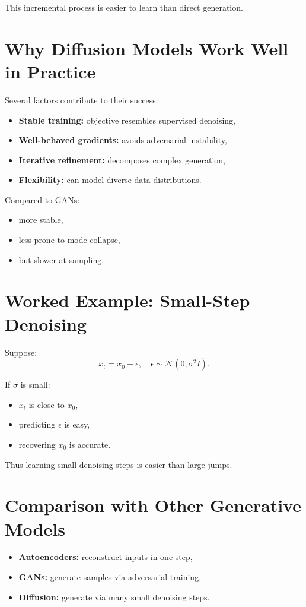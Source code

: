 This incremental process is easier to learn than direct generation.

\section{Why Diffusion Models Work Well in Practice}

Several factors contribute to their success:

\begin{itemize}
    \item \textbf{Stable training:} objective resembles supervised denoising,
    \item \textbf{Well-behaved gradients:} avoids adversarial instability,
    \item \textbf{Iterative refinement:} decomposes complex generation,
    \item \textbf{Flexibility:} can model diverse data distributions.
\end{itemize}

Compared to GANs:
\begin{itemize}
    \item more stable,
    \item less prone to mode collapse,
    \item but slower at sampling.
\end{itemize}

\section{Worked Example: Small-Step Denoising}

Suppose:
\[
x_t = x_0 + \epsilon,
\quad \epsilon \sim \mathcal{N}(0, \sigma^2 I).
\]

If $\sigma$ is small:
\begin{itemize}
    \item $x_t$ is close to $x_0$,
    \item predicting $\epsilon$ is easy,
    \item recovering $x_0$ is accurate.
\end{itemize}

Thus learning small denoising steps is easier than large jumps.

\section{Comparison with Other Generative Models}

\begin{itemize}
    \item \textbf{Autoencoders:} reconstruct inputs in one step,
    \item \textbf{GANs:} generate samples via adversarial training,
    \item \textbf{Diffusion:} generate via many small denoising steps.
\end{itemize}


